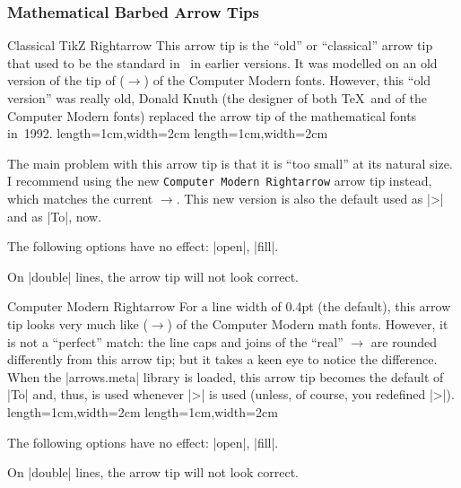 \subsubsection{Mathematical Barbed Arrow Tips}

\begin{arrowtip}{Classical TikZ Rightarrow}{
    This arrow tip is the ``old'' or ``classical'' arrow tip that used to be
    the standard in \tikzname\ in earlier versions. It was modelled on an old
    version of the tip of \texttt{\string\rightarrow} ($\rightarrow$) of the
    Computer Modern fonts. However, this ``old version'' was really old, Donald
    Knuth (the designer of both \TeX\ and of the Computer Modern fonts)
    replaced the arrow tip of the mathematical fonts in~1992.
}%
{length=1cm,width=2cm}%
{length=1cm,width=2cm}

    The main problem with this arrow tip is that it is ``too small'' at its
    natural size. I recommend using the new \texttt{Computer Modern Rightarrow}
    arrow tip instead, which matches the current $\to$. This new version is
    also the default used as |>| and as |To|, now.
    \begin{arrowexamples}
        \arrowexample[]
        \arrowexampledup[sep]
        \arrowexampledupdot[sep]
        \arrowexample[length=3pt]
        \arrowexample[sharp]
        \arrowexample[slant=.3]
        \arrowexample[left]
        \arrowexample[right]
        \arrowexample[red]
    \end{arrowexamples}
    The following options have no effect: |open|, |fill|.

    On |double| lines, the arrow tip will not look correct.
\end{arrowtip}

\begin{arrowtip}{Computer Modern Rightarrow}{
    For a line width of 0.4pt (the default), this arrow tip looks very much
    like \texttt{\string\rightarrow} ($\to$) of the Computer Modern math fonts.
    However, it is not a ``perfect'' match: the line caps and joins of the
    ``real'' $\to$ are rounded differently from this arrow tip; but it takes a
    keen eye to notice the difference. When the |arrows.meta| library is loaded,
    this arrow tip becomes the default of |To| and, thus, is used whenever |>|
    is used (unless, of course, you redefined |>|).
}%
{length=1cm,width=2cm}%
{length=1cm,width=2cm}

    \begin{arrowexamples}
        \arrowexample[]
        \arrowexampledup[sep]
        \arrowexampledupdot[sep]
        \arrowexample[length=3pt]
        \arrowexample[sharp]
        \arrowexample[slant=.3]
        \arrowexample[left]
        \arrowexample[right]
        \arrowexample[red]
    \end{arrowexamples}
    The following options have no effect: |open|, |fill|.

    On |double| lines, the arrow tip will not look correct.
\end{arrowtip}

